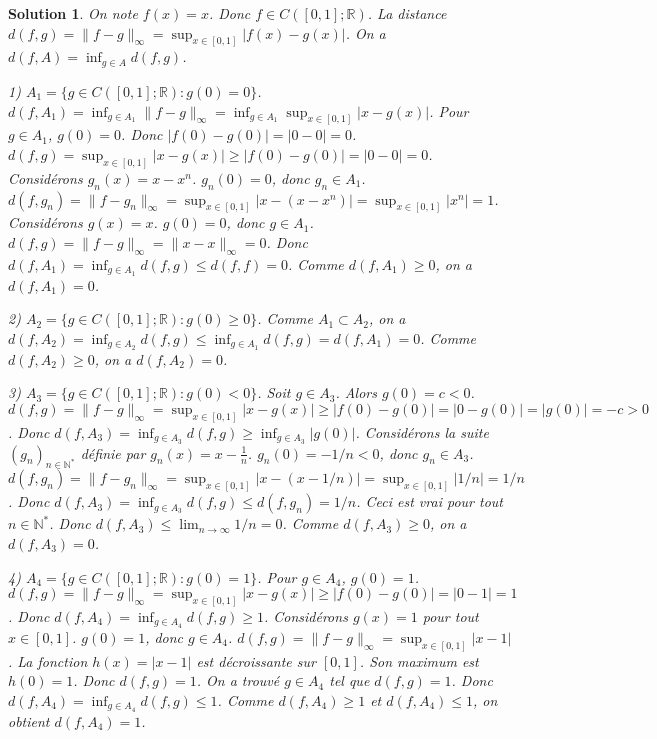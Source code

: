 \documentclass{article}
\newtheorem{solution}{Solution}
\begin{document}
\begin{solution}
On note $f(x) = x$. Donc $f \in C([0,1]; \mathbb{R})$.
La distance $d(f, g) = \|f-g\|_\infty = \sup_{x \in [0,1]} |f(x) - g(x)|$.
On a $d(f, A) = \inf_{g \in A} d(f, g)$.

1) $A_1 = \{ g \in C([0, 1]; \mathbb{R}) : g(0) = 0 \}$.
$d(f, A_1) = \inf_{g \in A_1} \|f-g\|_\infty = \inf_{g \in A_1} \sup_{x \in [0,1]} |x - g(x)|$.
Pour $g \in A_1$, $g(0) = 0$. Donc $|f(0) - g(0)| = |0 - 0| = 0$.
$d(f, g) = \sup_{x \in [0,1]} |x - g(x)| \geq |f(0) - g(0)| = |0 - 0| = 0$.
Considérons $g_n(x) = x - x^n$. $g_n(0) = 0$, donc $g_n \in A_1$.
$d(f, g_n) = \|f - g_n\|_\infty = \sup_{x \in [0,1]} |x - (x - x^n)| = \sup_{x \in [0,1]} |x^n| = 1$.
Considérons $g(x) = x$. $g(0) = 0$, donc $g \in A_1$.
$d(f, g) = \|f - g\|_\infty = \|x - x\|_\infty = 0$.
Donc $d(f, A_1) = \inf_{g \in A_1} d(f, g) \leq d(f, f) = 0$.
Comme $d(f, A_1) \geq 0$, on a $d(f, A_1) = 0$.

2) $A_2 = \{ g \in C([0, 1]; \mathbb{R}) : g(0) \geq 0 \}$.
Comme $A_1 \subset A_2$, on a $d(f, A_2) = \inf_{g \in A_2} d(f, g) \leq \inf_{g \in A_1} d(f, g) = d(f, A_1) = 0$.
Comme $d(f, A_2) \geq 0$, on a $d(f, A_2) = 0$.

3) $A_3 = \{ g \in C([0, 1]; \mathbb{R}) : g(0) < 0 \}$.
Soit $g \in A_3$. Alors $g(0) = c < 0$.
$d(f, g) = \|f-g\|_\infty = \sup_{x \in [0,1]} |x - g(x)| \geq |f(0) - g(0)| = |0 - g(0)| = |g(0)| = -c > 0$.
Donc $d(f, A_3) = \inf_{g \in A_3} d(f, g) \geq \inf_{g \in A_3} |g(0)|$.
Considérons la suite $(g_n)_{n \in \mathbb{N}^*}$ définie par $g_n(x) = x - \frac{1}{n}$.
$g_n(0) = -1/n < 0$, donc $g_n \in A_3$.
$d(f, g_n) = \|f - g_n\|_\infty = \sup_{x \in [0,1]} |x - (x - 1/n)| = \sup_{x \in [0,1]} |1/n| = 1/n$.
Donc $d(f, A_3) = \inf_{g \in A_3} d(f, g) \leq d(f, g_n) = 1/n$.
Ceci est vrai pour tout $n \in \mathbb{N}^*$. Donc $d(f, A_3) \leq \lim_{n \to \infty} 1/n = 0$.
Comme $d(f, A_3) \geq 0$, on a $d(f, A_3) = 0$.

4) $A_4 = \{ g \in C([0, 1]; \mathbb{R}) : g(0) = 1 \}$.
Pour $g \in A_4$, $g(0) = 1$.
$d(f, g) = \|f-g\|_\infty = \sup_{x \in [0,1]} |x - g(x)| \geq |f(0) - g(0)| = |0 - 1| = 1$.
Donc $d(f, A_4) = \inf_{g \in A_4} d(f, g) \geq 1$.
Considérons $g(x) = 1$ pour tout $x \in [0,1]$. $g(0)=1$, donc $g \in A_4$.
$d(f, g) = \|f-g\|_\infty = \sup_{x \in [0,1]} |x - 1|$. La fonction $h(x) = |x-1|$ est décroissante sur $[0,1]$. Son maximum est $h(0)=1$.
Donc $d(f, g) = 1$.
On a trouvé $g \in A_4$ tel que $d(f, g) = 1$.
Donc $d(f, A_4) = \inf_{g \in A_4} d(f, g) \leq 1$.
Comme $d(f, A_4) \geq 1$ et $d(f, A_4) \leq 1$, on obtient $d(f, A_4) = 1$.
\end{solution}
\end{document}

